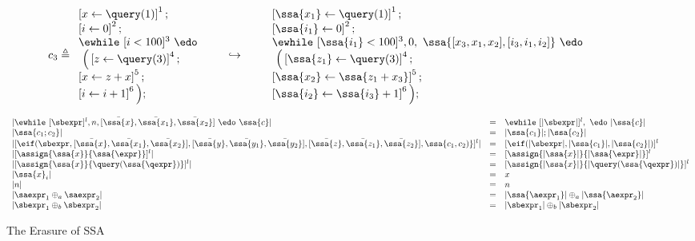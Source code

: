 {
\[
c_3 \triangleq
\begin{array}{l}
     \left[x \leftarrow \query(1) \right]^1 ; \\
     \left[i \leftarrow 0 \right]^2 ; \\
    \ewhile ~  [i < 100]^3 ~ \edo
    \\
    ~ \Big( 
    \left[z \leftarrow \query(3) \right]^4; \\
    \left[x \leftarrow z + x \right]^5; \\
    \left[i \leftarrow i + 1 \right]^6
    \Big) ;
\end{array}
%
\hspace{20pt} \hookrightarrow \hspace{20pt} 
%
\begin{array}{l}
     \left[\ssa{x_1} \leftarrow \query(1) \right]^1 ; \\
     \left[\ssa{i_1} \leftarrow 0 \right]^2 ; \\
    \ewhile
    ~ [\ssa{i_1} < 100]^3, 0,
    ~\ssa{[ x_3,x_1 ,x_2 ], [i_3, i_1, i_2] }~
    \edo \\
    ~ \Big( 
    \left[\ssa{z_1} \leftarrow \query(3) \right]^4; \\
    \left[ \ssa{x_2} \leftarrow \ssa{z_1 + x_3} \right]^5; \\
    \left[\ssa{i_2} \leftarrow \ssa{i_3} + 1 \right]^6
    \Big) ;
\end{array}
\]
}
%
\begin{figure}
   \[
 \begin{array}{lll}
    | \ewhile ~ [ \sbexpr ]^{l}, n, [\bar{\ssa{x}}, \bar{\ssa{x_1}}, \bar{\ssa{x_2}}] 
    ~ \edo ~  \ssa{c}|  
    &=& \ewhile ~ [|\sbexpr|]^{l},  ~ \edo ~ |\ssa{c}| 
	\\
    |\ssa{c_1 ; c_2}|  &=& |\ssa{c_1}| ; |\ssa{c_2}| 
    \\
    |[\eif(\sbexpr,
    [ \bar{\ssa{x}}, \bar{\ssa{x_1}}, \bar{\ssa{x_2}}] ,
    [ \bar{\ssa{y}}, \bar{\ssa{y_1}}, \bar{\ssa{y_2}}] , 
    [\bar{\ssa{z}}, \bar{\ssa{z_1}}, \bar{\ssa{z_2}}] , 
    \ssa{ c_1, c_2)}]^{l}|  
    &=&
    [\eif(|\sbexpr|, |\ssa{ c_1}|, |\ssa{c_2}|)]^{l}
    \\
    | [\assign {\ssa{x}}{\ssa{\expr}}]^{l}| & = & [\assign {|\ssa{x}|}{|\ssa{\expr}|} ]^{l}
    \\
    | [\assign {\ssa{x}}{\query(\ssa{\qexpr})} ]^{l} | & = & [\assign {|\ssa{x}|}{|\query(\ssa{\qexpr})|}]^{l}
    \\
    |\ssa{x}_i| & = & x 
    \\
    |n | & = & n 
    \\
    | \saexpr_1 \oplus_{a} \saexpr_2 | & = &  |\ssa{\aexpr_1}| \oplus_a |\ssa{\aexpr_2}| \\
    | \sbexpr_1 \oplus_{b} \sbexpr_2 | & = &  |\sbexpr_1| \oplus_b |\sbexpr_2|
 \end{array}
\]
    \caption{The Erasure of SSA}
    \label{fig:ssa_erasure-while}
\end{figure}
%
%
%
% 
%
